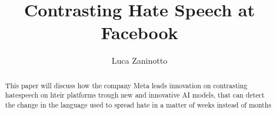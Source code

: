 \documentclass[12pt, a4paper]{article}
\title{Contrasting Hate Speech at Facebook}
\author{
  Luca Zaninotto
}
\begin{document}
\maketitle
\begin{abstract}
  This paper will discuss how the company Meta leads innovation on
  contrasting hatespeech on hteir platforms trough new and innovative
  AI models, that can detect the change in the language used to spread
  hate in a matter of weeks instead of months
\end{abstract}






\newpage
\printbibliography[title={Bibliography}]
\end{document}

